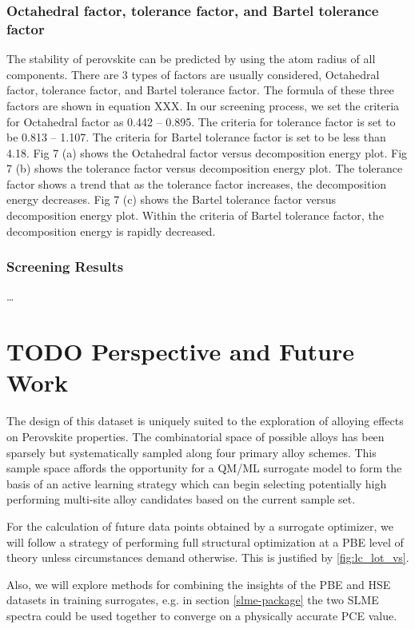 \documentclass[twoside, twocolumn, 9pt, draft]{article}
\begin{document}
\subsubsection*{Octahedral factor, tolerance factor, and Bartel tolerance factor}
\label{sec:org56472b2}
The stability of perovskite can be predicted by using the atom radius of
all components. There are 3 types of factors are usually considered,
Octahedral factor, tolerance factor, and Bartel tolerance factor. The
formula of these three factors are shown in equation XXX. In our
screening process, we set the criteria for Octahedral factor as 0.442 --
0.895. The criteria for tolerance factor is set to be 0.813 -- 1.107.
The criteria for Bartel tolerance factor is set to be less than 4.18.
Fig 7 (a) shows the Octahedral factor versus decomposition energy plot.
Fig 7 (b) shows the tolerance factor versus decomposition energy plot.
The tolerance factor shows a trend that as the tolerance factor
increases, the decomposition energy decreases. Fig 7 (c) shows the
Bartel tolerance factor versus decomposition energy plot. Within the
criteria of Bartel tolerance factor, the decomposition energy is rapidly
decreased.

\subsubsection*{Screening Results}
\label{sec:org4106cb9}
\ldots{}\\

\section*{{\bfseries\sffamily TODO} Perspective and Future Work}
\label{sec:orgc437d83}
The design of this dataset is uniquely suited to the exploration of
alloying effects on Perovskite properties. The combinatorial space of
possible alloys has been sparsely but systematically sampled along
four primary alloy schemes. This sample space affords the opportunity
for a QM/ML surrogate model to form the basis of an active learning
strategy which can begin selecting potentially high performing
multi-site alloy candidates based on the current sample set.

For the calculation of future data points obtained by a surrogate
optimizer, we will follow a strategy of performing full structural
optimization at a PBE level of theory unless circumstances demand
otherwise. This is justified by \ref{fig:lc_lot_vs}.

Also, we will explore methods for combining the insights of the PBE
and HSE datasets in training surrogates, e.g. in section
\ref{slme-package} the two SLME spectra could be used together to
converge on a physically accurate PCE value.
\end{document}
